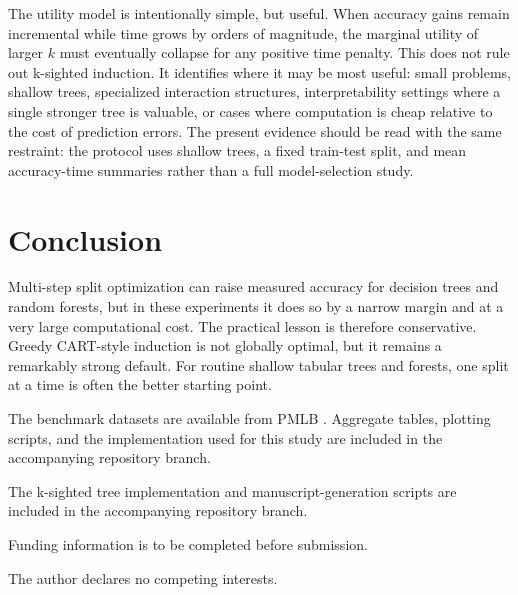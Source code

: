 \documentclass[pdflatex,sn-mathphys-num]{sn-jnl}
\begin{document}
The utility model is intentionally simple, but useful. When accuracy gains remain incremental while time grows by orders of magnitude, the marginal utility of larger $k$ must eventually collapse for any positive time penalty. This does not rule out k-sighted induction. It identifies where it may be most useful: small problems, shallow trees, specialized interaction structures, interpretability settings where a single stronger tree is valuable, or cases where computation is cheap relative to the cost of prediction errors. The present evidence should be read with the same restraint: the protocol uses shallow trees, a fixed train-test split, and mean accuracy-time summaries rather than a full model-selection study.

\section{Conclusion}\label{sec:conclusion}

Multi-step split optimization can raise measured accuracy for decision trees and random forests, but in these experiments it does so by a narrow margin and at a very large computational cost. The practical lesson is therefore conservative. Greedy CART-style induction is not globally optimal, but it remains a remarkably strong default. For routine shallow tabular trees and forests, one split at a time is often the better starting point.

\backmatter

The benchmark datasets are available from PMLB \cite{olson2017pmlb}. Aggregate tables, plotting scripts, and the implementation used for this study are included in the accompanying repository branch.

The k-sighted tree implementation and manuscript-generation scripts are included in the accompanying repository branch.

Funding information is to be completed before submission.

The author declares no competing interests.


\end{document}

